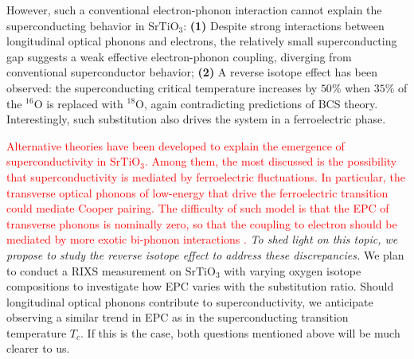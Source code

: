 \documentclass[11pt]{article}
\begin{document}
However, such a conventional electron-phonon interaction cannot explain the superconducting behavior in $\mathrm{SrTiO_{3}}$: \textbf{(1)} Despite strong interactions between longitudinal optical phonons and electrons, the relatively small superconducting gap suggests a weak effective electron-phonon coupling, diverging from conventional superconductor behavior\cite{swartz_polaronic_2018}; 
\textbf{(2)} A reverse isotope effect has been observed: the superconducting critical temperature increases by $50\%$  when $35\%$ of the ${}^{16}\mathrm{O}$ is replaced with ${}^{18}\mathrm{O}$\cite{stucky_isotope_2016}, again contradicting predictions of BCS theory. Interestingly, such substitution also drives the system in a ferroelectric phase\cite{gastiasoro_supercondutivity_2020}.

\textcolor{red}{Alternative theories have been developed to explain the emergence of superconductivity in $\mathrm{SrTiO_3}$. Among them, the most discussed is the possibility that superconductivity is mediated by ferroelectric fluctuations. In particular, the transverse optical phonons of low-energy that drive the ferroelectric transition could mediate Cooper pairing. The difficulty of such model is that the EPC of transverse phonons is nominally zero, so that the coupling to electron should be mediated by more exotic bi-phonon interactions \cite{gastiasoro_phonon-mediated_2019}. }
\textit{To shed light on this topic, we propose to study the reverse isotope effect to address these discrepancies.} We plan to conduct a RIXS measurement on $\mathrm{SrTiO_{3}}$ with varying oxygen isotope compositions to investigate how EPC varies with the substitution ratio.  Should longitudinal optical phonons contribute to superconductivity, we anticipate observing a similar trend in EPC as in the superconducting transition temperature $T_{c}$. If this is the case, both questions mentioned above will be much clearer to us. 
\end{document}
